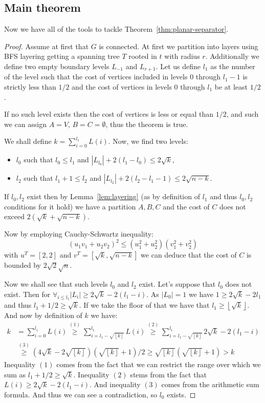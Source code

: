 \subsection{Main theorem}
Now we have all of the tools to tackle Theorem~\ref{thm:planar-separator}.
\begin{proof}
Assume at first that $G$ is connected. At first we partition into layers using
BFS layering getting a spanning tree $T$ rooted in $t$ with radius $r$.
Additionally we define two empty boundary levels $L_{-1}$ and $L_{r+1}$. Let us
define $l_1$ as the number of the level such that the cost of vertices included in
levels $0$ through $l_1 - 1$ is strictly less than $1/2$ and the cost of
vertices in levels $0$ through $l_1$ be at least $1/2$.

If no such level exists
then the cost of vertices is less or equal than $1/2$, and such we can assign $A = V$,
$B = C = \emptyset$, thus the theorem is true.

We shall define $k = \sum_{i=0}^{l_1}L(i)$. Now, we find two levels:
\begin{itemize}
    \item $l_0$ such that $l_0 \leq l_1$ and $|L_{l_0}| + 2(l_1 - l_0) \leq 2
        \sqrt{k}$,
    \item $l_2$ such that $l_1 + 1 \leq l_2$ and $|L_{l_2}| + 2(l_2-l_1-1) \leq 2
        \sqrt{n - k}$.
\end{itemize}
If $l_0, l_2$ exist then by Lemma~\ref{lem:layering} (as by definition of
$l_1$ and thus $l_0, l_2$ conditions for it hold) we have a partition $A, B, C$
and the cost of $C$ does not exceed $2(\sqrt{k} + \sqrt{n-k})$.

Now by employing
Cauchy-Schwartz inequality:
$$
    (u_1v_1 + u_2v_2)^2 \leq (u_1^2 + u_2^2)(v_1^2 + v_2^2)
$$
with $u^T = [2, 2]$ and $v^T = [\sqrt{k}, \sqrt{n - k}]$ we can deduce that the
cost of $C$ is bounded by $2\sqrt{2} \sqrt{n}$.

Now we shall see that such levels $l_0$ and $l_2$ exist. Let's suppose that
$l_0$ does not exist. Then for $\forall_{i \leq l_1} |L_{i}| \geq 2 \sqrt{k} -
2(l_1 - i)$. As $|L_0| = 1$ we have $1 \geq 2\sqrt{k} - 2l_1$ and thus
$l_1 + 1/2 \geq \sqrt{k}$. If we take the floor of that we have that $l_1 \geq
\left \lfloor{\sqrt{k}}\right \rfloor$. And now by definition of $k$ we have:
\begin{align*}
    k &= \sum_{i=0}^{l_1} L(i) \overset{(1)}{\geq} \sum_{i=l_1 - \sqrt{\left
\lfloor{k}\right \rfloor}}^{l_1} L(i)
\overset{(2)}{\geq} \sum_{i=l_1 - \sqrt{\left \lfloor{k}\right \rfloor}}^{l_1} 2\sqrt{k} - 2(l_1 - i) \\
      & \overset{(3)}{\geq} (4\sqrt{k} - 2 \sqrt{\left \lfloor{k}\right
          \rfloor}) (\sqrt{\left \lfloor{k}\right \rfloor} + 1)/2
          \geq \sqrt{\left \lfloor{k}\right \rfloor}(\sqrt{\left
      \lfloor{k}\right \rfloor} + 1) > k
\end{align*}
Inequality $(1)$ comes from the fact that we can restrict the range over which
we sum as $l_1 + 1/2 \geq \sqrt{k}$. Inequality $(2)$ stems from the fact that
$L(i) \geq 2 \sqrt{k} - 2(l_1 - i)$. And inequality $(3)$ comes from the
arithmetic sum formula. And thus we can see a contradiction, so $l_0$ exists.


\end{proof}
